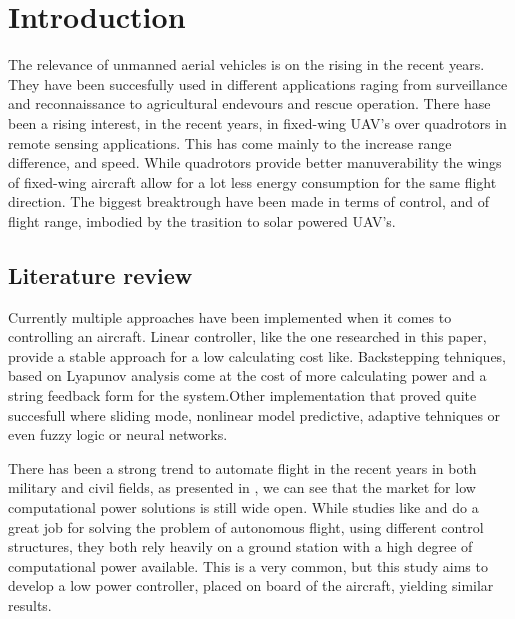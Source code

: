 \documentclass[conference]{IEEEtran}
\begin{document}
\section{Introduction}
The relevance of unmanned aerial vehicles is on the rising in the recent years.
They have been succesfully used in different applications raging from surveillance and reconnaissance to agricultural endevours and rescue operation. There hase been a rising interest, in the recent years, in fixed-wing UAV's over quadrotors in remote sensing applications.
This has come mainly to the increase range difference, and speed. 
While quadrotors provide better manuverability the wings of fixed-wing aircraft allow for a lot less energy consumption for the same flight direction. The biggest breaktrough have been made in terms of control,\cite{A full controller for a fixed-wing UAV}\cite{Optimal Path Following for Small Fixed-Wing UAVs Under Wind Disturbances} and of flight range, imbodied by the trasition to solar powered UAV's\cite{Electric aircraft - present and futur}\cite{Electric aviation: A review of concepts and enabling technologies}.
\subsection{Literature review}
Currently multiple approaches have been implemented when it comes to controlling an aircraft. Linear controller, like the one researched in this paper, provide a stable approach for a low calculating cost like\cite{Linear}. Backstepping tehniques, based on Lyapunov analysis come at the cost of more calculating power and a string feedback form for the system\cite{Backstepping}.Other implementation that proved quite succesfull where sliding mode\cite{Sliding Mode}, nonlinear model predictive\cite{Nonlinear Model Predictive}, adaptive tehniques\cite{Adaptive} or even fuzzy logic or neural networks\cite{Fuzzy}\cite{NN}. 

\par
There has been a strong trend to automate flight in the recent years in
both military and civil fields, as presented in {{\cite{lessons}}}, we can see
that the market for low computational power solutions is still wide open. While
studies like {{\cite{Gain_Scheduled}}} and {{\cite{UTC}}} do a great job for
solving the problem of autonomous flight, using different control structures,
they both rely heavily on a ground station with a high degree of computational
power available. This is a very common, but this study aims to develop a low
power controller, placed on board of the aircraft, yielding similar results.
\end{document}
